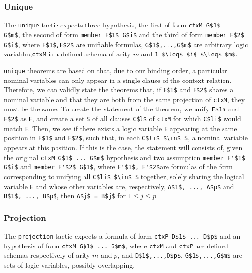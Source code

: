 \documentclass[nocopyrightspace,authoryear]{sigplanconf}
\begin{document}
\subsubsection{Unique}
The \lstinline|unique| tactic expects three hypothesis, the first of form \lstinline|ctxM G$1$ ... G$m$|, the second of form \lstinline|member F$1$ G$i$| and the third of form \lstinline|member F$2$ G$i$|, where \lstinline|F$1$,F$2$| are unifiable formulas, \lstinline|G$1$,...,G$m$| are arbitrary logic variables,\lstinline|ctxM| is a defined schema of arity $m$ and \lstinline|1 $\leq$ $i$ $\leq$ $m$|.

\lstinline|unique| theorems are based on that, due to our binding order, a particular nominal variables can only appear in a single clause of the context relation. Therefore, we can validly state the theorems that, if \lstinline|F$1$| and \lstinline|F$2$| shares a nominal variable and that they are both from the same projection of \lstinline|ctxM|, they must be the same. To create the statement of the theorem, we unify \lstinline|F$1$| and \lstinline|F$2$| as \lstinline|F|, and create a set \lstinline|S| of all clauses \lstinline|C$l$| of \lstinline|ctxM| for which \lstinline|C$li$| would match \lstinline|F|. Then, we see if there exists a logic variable \lstinline|E| appearing at the same position in \lstinline|F$1$| and \lstinline|F$2$|, such that, in each \lstinline|C$li$ $\in$ S|, a nominal variable appears at this position. If this is the case, the statement will consists of, given the original \lstinline|ctxM G$1$ ... G$m$| hypothesis and two assumption \lstinline|member F'$1$ G$i$| and \lstinline|member F'$2$ G$1$|, where \lstinline|F'$1$, F'$2$|are formulas of the form corresponding to unifying all \lstinline|C$li$ $\in$ S| together, solely sharing the logical variable \lstinline|E| and whose other variables are, respectively, \lstinline|A$1$, ..., A$p$| and \lstinline|B$1$, ..., B$p$|, then \lstinline|A$j$ = B$j$| for $1 \leq j \leq p$



\subsubsection{Projection}
The \lstinline|projection| tactic expects a formula of form \lstinline|ctxP D$1$ ... D$p$| and an hypothesis of form \lstinline|ctxM G$1$ ... G$m$|, where \lstinline|ctxM| and \lstinline|ctxP| are defined schemas respectively of arity $m$ and $p$, and \lstinline|D$1$,...,D$p$|, \lstinline|G$1$,...,G$m$| are sets of logic variables, possibly overlapping.
\end{document}
